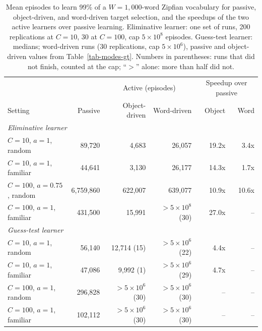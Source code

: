 \documentclass[a4paper,natbib,man]{apa6}
\begin{document}
\begin{table}[h]
\centering
\caption{\label{tab-word-driven} Mean episodes to learn 99\% of a $W=1{,}000$-word Zipfian vocabulary for passive, object-driven, and word-driven target selection, and the speedups of the two active learners over passive learning. Eliminative learner: one set of runs, 200 replications at $C=10$, 30 at $C=100$, cap $5 \times 10^8$ episodes. Guess-test learner: medians; word-driven runs (30 replications, cap $5 \times 10^6$), passive and object-driven values from Table~\ref{tab-modes-gt}. Numbers in parentheses: runs that did not finish, counted at the cap; ``$>$'' alone: more than half did not.}
\footnotesize
\setlength{\tabcolsep}{4pt}
\begin{tabular}{lrrrrr}
\hline
 & & \multicolumn{2}{c}{Active (episodes)} & \multicolumn{2}{c}{Speedup over passive} \\
Setting & Passive & Object-driven & Word-driven & Object & Word \\
\hline
\multicolumn{6}{l}{\textit{Eliminative learner}} \\
$C=10$, $a=1$, random & 89{,}720 & 4{,}683 & 26{,}057 & 19.2x & 3.4x \\
$C=10$, $a=1$, familiar & 44{,}641 & 3{,}130 & 26{,}177 & 14.3x & 1.7x \\
$C=100$, $a=0.75$, random & 6{,}759{,}860 & 622{,}007 & 639{,}077 & 10.9x & 10.6x \\
$C=100$, $a=1$, familiar & 431{,}500 & 15{,}991 & $>5 \times 10^8$ (30) & 27.0x & -- \\
\multicolumn{6}{l}{\textit{Guess-test learner}} \\
$C=10$, $a=1$, random & 56{,}140 & 12{,}714 (15) & $>5 \times 10^6$ (22) & 4.4x & -- \\
$C=10$, $a=1$, familiar & 47{,}086 & 9{,}992 (1) & $>5 \times 10^6$ (29) & 4.7x & -- \\
$C=100$, $a=1$, random & 296{,}828 & $>5 \times 10^6$ (30) & $>5 \times 10^6$ (30) & -- & -- \\
$C=100$, $a=1$, familiar & 102{,}112 & $>5 \times 10^6$ (30) & $>5 \times 10^6$ (30) & -- & -- \\
\hline
\end{tabular}
\end{table}
\end{document}
